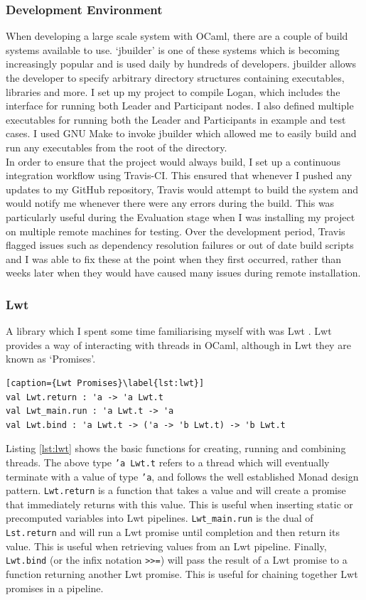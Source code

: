 \documentclass[12pt,a4paper,twoside,openright]{report}
\begin{document}
	\subsubsection*{Development Environment}
	When developing a large scale system with OCaml, there are a couple of build systems available to use. 
	`jbuilder' \cite{jbuilder} is one of these systems which is becoming increasingly popular and is used daily by hundreds of developers.
	jbuilder allows the developer to specify arbitrary directory structures containing executables, libraries and more.
	I set up my project to compile Logan, which includes the interface for running both Leader and Participant nodes. 
	I also defined multiple executables for running both the Leader and Participants in example and test cases. 
	I used GNU Make \cite{GNUMake} to invoke jbuilder which allowed me to easily build and run any executables from the root of the directory.\\
	
	In order to ensure that the project would always build, I set up a continuous integration workflow using Travis-CI. 
	This ensured that whenever I pushed any updates to my GitHub repository, Travis would attempt to build the system and would notify me whenever there were any errors during the build.
	This was particularly useful during the Evaluation stage when I was installing my project on multiple remote machines for testing.
	Over the development period, Travis flagged issues such as dependency resolution failures or out of date build scripts and I was able to fix these at the point when they first occurred, rather than weeks later when they would have caused many issues during remote installation.

	\subsubsection*{Lwt}
	A library which I spent some time familiarising myself with was Lwt \cite{Lwt}. 
	Lwt provides a way of interacting with threads in OCaml, although in Lwt they are known as `Promises'.
	\begin{lstlisting}[caption={Lwt Promises}\label{lst:lwt}]
val Lwt.return : 'a -> 'a Lwt.t 
val Lwt_main.run : 'a Lwt.t -> 'a
val Lwt.bind : 'a Lwt.t -> ('a -> 'b Lwt.t) -> 'b Lwt.t
	\end{lstlisting}
	Listing \ref{lst:lwt} shows the basic functions for creating, running and combining threads.
	The above type \texttt{'a Lwt.t} refers to a thread which will eventually terminate with a value of type \texttt{'a}, and follows the well established Monad design pattern.
	\texttt{Lwt.return} is a function that takes a value and will create a promise that immediately returns with this value.
	This is useful when inserting static or precomputed variables into Lwt pipelines.
	\texttt{Lwt\_main.run} is the dual of \texttt{Lst.return} and will run a Lwt promise until completion and then return its value.
	This is useful when retrieving values from an Lwt pipeline.
	Finally, \texttt{Lwt.bind} (or the infix notation \texttt{>>=}) will pass the result of a Lwt promise to a function returning another Lwt promise.
	This is useful for chaining together Lwt promises in a pipeline.
\end{document}
